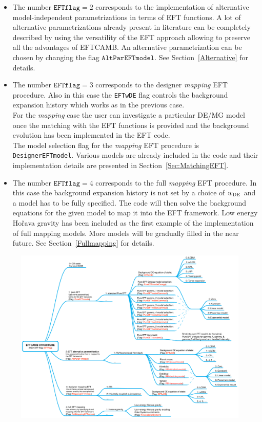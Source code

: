 \documentclass[prd,nofootinbib,showpacs]{revtex4}
\begin{document}
{\begin{itemize}
%
\item The number $\texttt{EFTflag}=2$  corresponds to the implementation of alternative model-independent parametrizations in terms of EFT functions.   A lot of alternative parametrizations already present in literature can be completely described by using the versatility of the EFT approach allowing to preserve all the advantages of EFTCAMB. An alternative parametrization can be chosen by changing the flag $\texttt{AltParEFTmodel}$. See Section~\ref{Alternative} for details.
\item The number $\texttt{EFTflag}=3$  corresponds to the designer \textit{mapping} EFT procedure. Also in this case the \texttt{EFTwDE} flag controls the background expansion history which works as in the previous case.\\
For the \textit{mapping} case the user can investigate a particular DE/MG model once the matching with the EFT functions is provided and the background evolution has been implemented in the EFT code. \\
The model selection flag for the \textit{mapping} EFT procedure is \texttt{DesignerEFTmodel}.
Various models are already included in the code and their implementation details are presented in Section~\ref{Sec:MatchingEFT}. 
\item The number $\texttt{EFTflag}=4$  corresponds to the full \textit{mapping} EFT procedure. In this case the background expansion history is not set by a choice of $w_{\rm DE}$ and a model has to be fully specified. The code will then solve the background equations for the given model to map it into the EFT framework. Low energy Ho\v rava gravity has been included as the first example of the implementation of full mapping models. More models will be gradually filled in the near future. See Section~\ref{Fullmapping} for details.
\end{itemize}
%
\begin{figure}[!tp]
\begin{center}
 \includegraphics[width=\textwidth]{images/EFTCAMB_model_flags_V3}

\end{center}
\end{figure}}
\end{document}
